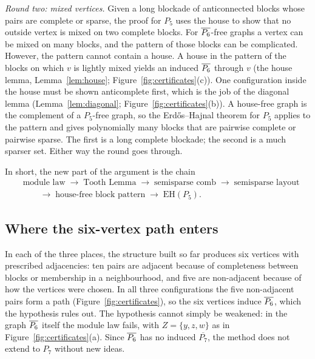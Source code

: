 \emph{Round two: mixed vertices.} Given a long blockade of anticonnected blocks whose pairs are complete
or sparse, the proof for $P_5$ uses the house to show that no outside vertex is mixed on two complete
blocks. For $\overline{P_6}$-free graphs a vertex can be mixed on many blocks, and the pattern of those blocks can be
complicated. However, the pattern cannot contain a house. A house in the pattern of the blocks on which
$v$ is lightly mixed yields an induced $\overline{P_6}$ through $v$ (the house lemma, Lemma~\ref{lem:house};
Figure~\ref{fig:certificates}(c)). One configuration inside the house must be shown anticomplete first,
which is the job of the diagonal lemma (Lemma~\ref{lem:diagonal}; Figure~\ref{fig:certificates}(b)). A
house-free graph is the complement of a $P_5$-free graph, so the Erd\H{o}s--Hajnal theorem for $P_5$
applies to the pattern and gives polynomially many blocks that are pairwise complete or pairwise sparse.
The first is a long complete blockade; the second is a much sparser set. Either way the round goes
through.

In short, the new part of the argument is the chain
\begin{align*}
&\text{module law}\;\to\;\text{Tooth Lemma}\;\to\;\text{semisparse comb}\;\to\;\text{semisparse layout}\\
&\qquad\to\;\text{house-free block pattern}\;\to\;\mathrm{EH}(P_5).
\end{align*}

\subsection*{Where the six-vertex path enters}
In each of the three places, the structure built so far produces six vertices with prescribed
adjacencies: ten pairs are adjacent because of completeness between blocks or membership in a
neighbourhood, and five are non-adjacent because of how the vertices were chosen. In all three
configurations the five non-adjacent pairs form a path (Figure~\ref{fig:certificates}), so the six
vertices induce $\overline{P_6}$, which the hypothesis rules out. The hypothesis cannot simply be weakened: in the
graph $\overline{P_6}$ itself the module law fails, with $Z=\{y,z,w\}$ as in Figure~\ref{fig:certificates}(a).
Since $\overline{P_6}$ has no induced $\overline{P_7}$, the method does not extend to $P_7$ without new ideas.

